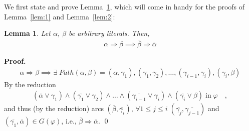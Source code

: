 \documentclass [11pt]{article}
\newtheorem{lemma}[theorem]{Lemma}
\newcommand{\Ra}{\Rightarrow}
\newcommand{\compl}[1]{\overline{#1}}
\renewcommand{\phi}{\varphi}
\def\oa{\overline{\alpha}}
\def\ob{\overline{\beta}}
\def\a{\alpha}
\def\b{\beta}
\def\g{\gamma}
\begin{document}
\noindent
We first state and prove Lemma~\ref{lem:handy}, which will come in handy for the proofs of Lemma~\ref{lem:1} and Lemma~\ref{lem:2}:
\begin{lemma}
\label{lem:handy}
Let $\a$, $\b$ be arbitrary literals. Then, 
\begin{align}
\a \Ra \b \implies \ob \Ra \oa
\end{align}
\end{lemma}

\noindent
{\bf Proof.}
\begin{align}
\a \Ra \b \implies \exists\; Path(\a, \b) =(\a, \g_1),(\g_1,\g_2),\dots,(\g_{i-1},\g_i),(\g_i,\b)
\end{align}
By the reduction
\begin{align}
(\oa \lor \g_1)\land (\compl{\g_1} \lor \g_2) \land \dots \land (\compl{\g_{i-1}} \lor \g_i) \land (\compl{\g_i} \lor \b)\; \mathrm{in}\; \phi \quad ,
\end{align}
and thus (by the reduction) arcs $(\ob, \compl{\g_{i}})$, $\forall 1 \leq j \leq i\; (\compl{\g_j}, \compl{\g_{j-1}})$ and $(\compl{\g_1}, \oa) \in G(\phi)$, i.e., $\ob \Ra \oa$. 
\qed

\smallskip
\end{document}
